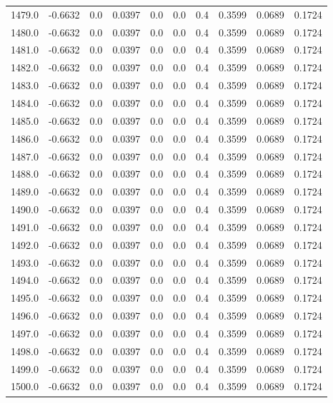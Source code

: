 \begin{longtable}{lrrrrrrrrr}
1479.0 & -0.6632 & 0.0 & 0.0397 & 0.0 & 0.0 & 0.4 & 0.3599 & 0.0689 & 0.1724 \\
1480.0 & -0.6632 & 0.0 & 0.0397 & 0.0 & 0.0 & 0.4 & 0.3599 & 0.0689 & 0.1724 \\
1481.0 & -0.6632 & 0.0 & 0.0397 & 0.0 & 0.0 & 0.4 & 0.3599 & 0.0689 & 0.1724 \\
1482.0 & -0.6632 & 0.0 & 0.0397 & 0.0 & 0.0 & 0.4 & 0.3599 & 0.0689 & 0.1724 \\
1483.0 & -0.6632 & 0.0 & 0.0397 & 0.0 & 0.0 & 0.4 & 0.3599 & 0.0689 & 0.1724 \\
1484.0 & -0.6632 & 0.0 & 0.0397 & 0.0 & 0.0 & 0.4 & 0.3599 & 0.0689 & 0.1724 \\
1485.0 & -0.6632 & 0.0 & 0.0397 & 0.0 & 0.0 & 0.4 & 0.3599 & 0.0689 & 0.1724 \\
1486.0 & -0.6632 & 0.0 & 0.0397 & 0.0 & 0.0 & 0.4 & 0.3599 & 0.0689 & 0.1724 \\
1487.0 & -0.6632 & 0.0 & 0.0397 & 0.0 & 0.0 & 0.4 & 0.3599 & 0.0689 & 0.1724 \\
1488.0 & -0.6632 & 0.0 & 0.0397 & 0.0 & 0.0 & 0.4 & 0.3599 & 0.0689 & 0.1724 \\
1489.0 & -0.6632 & 0.0 & 0.0397 & 0.0 & 0.0 & 0.4 & 0.3599 & 0.0689 & 0.1724 \\
1490.0 & -0.6632 & 0.0 & 0.0397 & 0.0 & 0.0 & 0.4 & 0.3599 & 0.0689 & 0.1724 \\
1491.0 & -0.6632 & 0.0 & 0.0397 & 0.0 & 0.0 & 0.4 & 0.3599 & 0.0689 & 0.1724 \\
1492.0 & -0.6632 & 0.0 & 0.0397 & 0.0 & 0.0 & 0.4 & 0.3599 & 0.0689 & 0.1724 \\
1493.0 & -0.6632 & 0.0 & 0.0397 & 0.0 & 0.0 & 0.4 & 0.3599 & 0.0689 & 0.1724 \\
1494.0 & -0.6632 & 0.0 & 0.0397 & 0.0 & 0.0 & 0.4 & 0.3599 & 0.0689 & 0.1724 \\
1495.0 & -0.6632 & 0.0 & 0.0397 & 0.0 & 0.0 & 0.4 & 0.3599 & 0.0689 & 0.1724 \\
1496.0 & -0.6632 & 0.0 & 0.0397 & 0.0 & 0.0 & 0.4 & 0.3599 & 0.0689 & 0.1724 \\
1497.0 & -0.6632 & 0.0 & 0.0397 & 0.0 & 0.0 & 0.4 & 0.3599 & 0.0689 & 0.1724 \\
1498.0 & -0.6632 & 0.0 & 0.0397 & 0.0 & 0.0 & 0.4 & 0.3599 & 0.0689 & 0.1724 \\
1499.0 & -0.6632 & 0.0 & 0.0397 & 0.0 & 0.0 & 0.4 & 0.3599 & 0.0689 & 0.1724 \\
1500.0 & -0.6632 & 0.0 & 0.0397 & 0.0 & 0.0 & 0.4 & 0.3599 & 0.0689 & 0.1724 \\
\end{longtable}